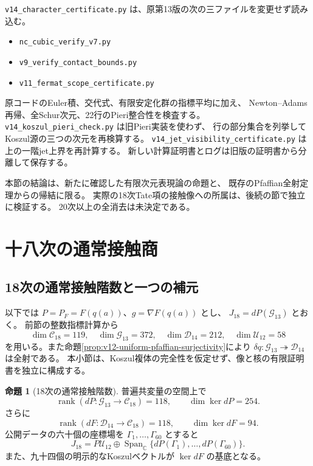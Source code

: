 \documentclass[a4paper,11pt]{ltjsarticle}
\theoremstyle{definition}
\newtheorem{proposition}[theorem]{命題}
\newcommand{\CC}{\mathbb C}
\begin{document}
\texttt{v14\_character\_certificate.py} は、原第13版の次の三ファイルを変更せず読み込む。
\begin{itemize}
 \item \texttt{nc\_cubic\_verify\_v7.py}
 \item \texttt{v9\_verify\_contact\_bounds.py}
 \item \texttt{v11\_fermat\_scope\_certificate.py}
\end{itemize}
原コードのEuler積、交代式、有限安定化群の指標平均に加え、
Newton--Adams再帰、全Schur次元、22行のPieri整合性を検査する。
\texttt{v14\_koszul\_pieri\_check.py} は旧Pieri実装を使わず、
行の部分集合を列挙してKoszul源の三つの次元を再検算する。
\texttt{v14\_jet\_visibility\_certificate.py} は上の一階jet上界を再計算する。
新しい計算証明書とログは旧版の証明書から分離して保存する。

本節の結論は、新たに確認した有限次元表現論の命題と、
既存のPfaffian全射定理からの帰結に限る。
実際の18次Tate項の接触像への所属は、後続の節で独立に検証する。
20次以上の全消去は未決定である。



\section{十八次の通常接触商}
\label{sec:v14-ordinary-contact}

\subsection{18次の通常接触階数と一つの補元}
\label{subsec:v14-eighteenth-contact-rank}

以下では $P=P_F=F(q(a))$、$g=\nabla F(q(a))$ とし、
$J_{18}=dP(\mathcal G_{13})$ とおく。
前節の整数指標計算から
\[
 \dim\mathcal C_{18}=119,\quad
 \dim\mathcal G_{13}=372,\quad
 \dim\mathcal D_{14}=212,\quad
 \dim\mathcal U_{12}=58
\]
を用いる。また命題\ref{prop:v12-uniform-pfaffian-surjectivity}により
$\delta q:\mathcal G_{13}\twoheadrightarrow\mathcal D_{14}$ は全射である。
本小節は、Koszul複体の完全性を仮定せず、像と核の有限証明書を独立に構成する。

\begin{proposition}[18次の通常接触階数]
\label{prop:v14-contact-rank-eighteenth}
普遍共変量の空間上で
\[
 \operatorname{rank}(dP:\mathcal G_{13}\longrightarrow\mathcal C_{18})=118,
 \qquad \dim\ker dP=254.
\]
さらに
\[
 \operatorname{rank}(dF:\mathcal D_{14}\longrightarrow\mathcal C_{18})=118,
 \qquad \dim\ker dF=94.
\]
公開データの六十個の座標場を $\Gamma_1,\ldots,\Gamma_{60}$ とすると
\[
 J_{18}=P\mathcal U_{12}\oplus
    \operatorname{Span}_{\CC}\{dP(\Gamma_1),\ldots,dP(\Gamma_{60})\}.
\]
また、九十四個の明示的なKoszulベクトルが $\ker dF$ の基底となる。
\end{proposition}
\end{document}
